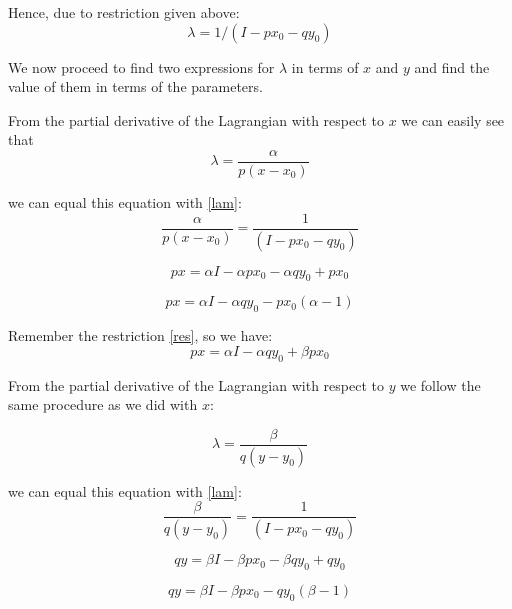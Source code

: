 \documentclass{article}
\begin{document}
Hence, due to restriction given above:
\begin{equation}\label{lam}
  \lambda = 1/(I - px_0 - qy_0)
\end{equation}

\medskip

We now proceed to find two expressions for $\lambda$ in terms of $x$ and $y$ and find the value of them in terms of the parameters.

From the partial derivative of the Lagrangian with respect to $x$ we can easily see that
\begin{equation}
  \lambda = \frac{\alpha}{p(x - x_0)}
\end{equation}

we can equal this equation with \ref{lam}:
\begin{equation}
  \frac{\alpha}{p(x - x_0)} = \frac{1}{(I - px_0 - qy_0)}
\end{equation}


\begin{equation}
  px = \alpha I - \alpha px_0 - \alpha q y_0 + px_0
\end{equation}

\begin{equation}
  px = \alpha I - \alpha q y_0 - px_0(\alpha - 1)
\end{equation}

\medskip

Remember the restriction \ref{res}, so we have:
\begin{equation}
  px = \alpha I - \alpha q y_0 + \beta px_0
\end{equation}

\medskip

From the partial derivative of the Lagrangian with respect to $y$ we follow the same procedure as we did with $x$:

\begin{equation}
  \lambda = \frac{\beta}{q(y - y_0)}
\end{equation}

we can equal this equation with \ref{lam}:
\begin{equation}
   \frac{\beta}{q(y - y_0)} = \frac{1}{(I - px_0 - qy_0)}
\end{equation}

\begin{equation}
  qy = \beta I - \beta px_0 - \beta q y_0 + qy_0
\end{equation}

\begin{equation}
  qy = \beta I - \beta px_0 - qy_0(\beta - 1)
\end{equation}
\end{document}
